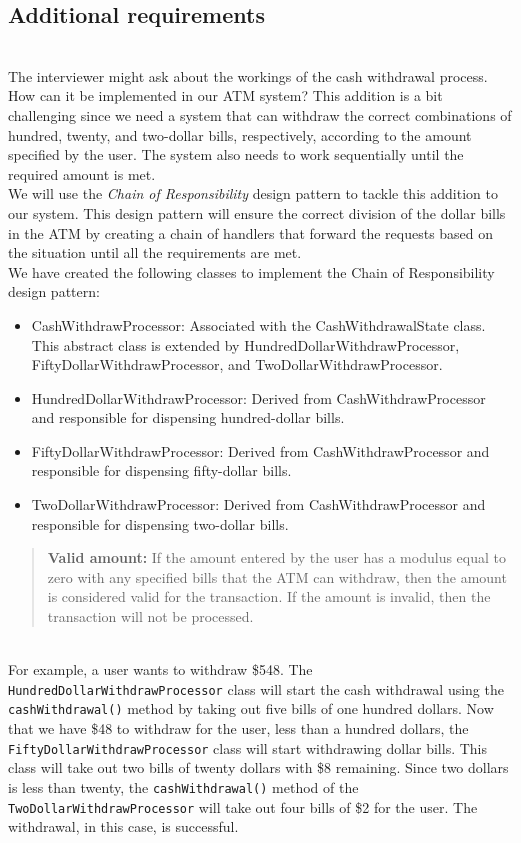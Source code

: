 \subsection{Additional requirements}\label{JQM3Q9Rgjjr_3HkNdIrTN}
\\
The interviewer might ask about the workings of the cash withdrawal process. How can it be implemented in our ATM system? This addition is a bit challenging since we need a system that can withdraw the correct combinations of hundred, twenty, and two-dollar bills, respectively, according to the amount specified by the user. The system also needs to work sequentially until the required amount is met.
\\
We will use the \emph{Chain of Responsibility} design pattern to tackle this addition to our system. This design pattern will ensure the correct division of the dollar bills in the ATM by creating a chain of handlers that forward the requests based on the situation until all the requirements are met.\\
We have created the following classes to implement the Chain of Responsibility design pattern:

\begin{itemize}
    \item CashWithdrawProcessor: Associated with the CashWithdrawalState class.
    This abstract class is extended by HundredDollarWithdrawProcessor,
    FiftyDollarWithdrawProcessor, and TwoDollarWithdrawProcessor.
    
    \item HundredDollarWithdrawProcessor: Derived from CashWithdrawProcessor 
    and responsible for dispensing hundred-dollar bills.
    
    \item FiftyDollarWithdrawProcessor: Derived from CashWithdrawProcessor 
    and responsible for dispensing fifty-dollar bills.
    
    \item TwoDollarWithdrawProcessor: Derived from CashWithdrawProcessor 
    and responsible for dispensing two-dollar bills.
\end{itemize}

\begin{quote}
\textbf{Valid amount:} If the amount entered by the user has a modulus equal to zero with any specified bills that the ATM can withdraw, then the amount is considered valid for the transaction. If the amount is invalid, then the transaction will not be processed.
\end{quote}
\\
For example, a user wants to withdraw \$548. The
\texttt{HundredDollarWithdrawProcessor} class will start the cash withdrawal using the \texttt{cashWithdrawal()} method by taking out five bills of one hundred dollars. Now that we have \$48 to withdraw for the user, less than a hundred dollars, the \texttt{FiftyDollarWithdrawProcessor} class will start withdrawing dollar bills. This class will take out two bills of twenty dollars with \$8 remaining. Since two dollars is less than twenty, the \texttt{cashWithdrawal()} method of the \texttt{TwoDollarWithdrawProcessor} will take out four bills of \$2 for the user. The withdrawal, in this case, is successful.

